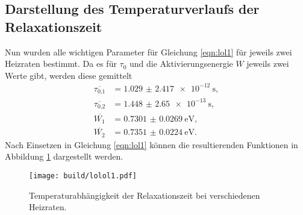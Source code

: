 \subsection{Darstellung des Temperaturverlaufs der Relaxationszeit}
Nun wurden alle wichtigen Parameter für Gleichung \eqref{eqn:lol1} für jeweils zwei Heizraten bestimmt.
Da es für $\tau_0$ und die Aktivierungsenergie $W$ jeweils zwei Werte gibt, werden diese gemittelt
\begin{align}
    \overline{\tau_{0\text{,}1}} &= \SI{1.029(2417)e-12}{\second},\\
    \overline{\tau_{0\text{,}2}} &= \SI{1.448(2650)e-13}{\second}, \\
    \overline{W_{1}} &= \SI{0.7301(269)}{\electronvolt}, \\
    \overline{W_{2}} &= \SI{0.7351(224)}{\electronvolt}. 
\end{align}
Nach Einsetzen in Gleichung \eqref{eqn:lol1} können die resultierenden Funktionen in Abbildung \ref{fig:whatthefuck} dargestellt werden.
\begin{figure}
    \centering
    \texttt{[image: build/lolol1.pdf]}
    \caption{Temperaturabhängigkeit der Relaxationszeit bei verschiedenen Heizraten.
            }
    \label{fig:whatthefuck}
\end{figure}

